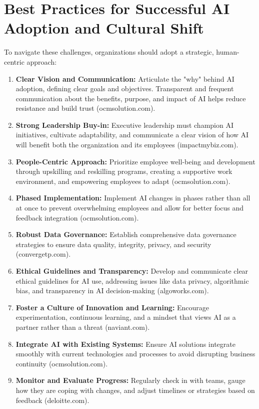 \section{Best Practices for Successful AI Adoption and Cultural Shift}
To navigate these challenges, organizations should adopt a strategic, human-centric approach:
\begin{enumerate}
    \item \textbf{Clear Vision and Communication:} Articulate the "why" behind AI adoption, defining clear goals and objectives. Transparent and frequent communication about the benefits, purpose, and impact of AI helps reduce resistance and build trust (ocmsolution.com).
    \item \textbf{Strong Leadership Buy-in:} Executive leadership must champion AI initiatives, cultivate adaptability, and communicate a clear vision of how AI will benefit both the organization and its employees (impactmybiz.com).
    \item \textbf{People-Centric Approach:} Prioritize employee well-being and development through upskilling and reskilling programs, creating a supportive work environment, and empowering employees to adapt (ocmsolution.com).
    \item \textbf{Phased Implementation:} Implement AI changes in phases rather than all at once to prevent overwhelming employees and allow for better focus and feedback integration (ocmsolution.com).
    \item \textbf{Robust Data Governance:} Establish comprehensive data governance strategies to ensure data quality, integrity, privacy, and security (convergetp.com).
    \item \textbf{Ethical Guidelines and Transparency:} Develop and communicate clear ethical guidelines for AI use, addressing issues like data privacy, algorithmic bias, and transparency in AI decision-making (algoworks.com).
    \item \textbf{Foster a Culture of Innovation and Learning:} Encourage experimentation, continuous learning, and a mindset that views AI as a partner rather than a threat (naviant.com).
    \item \textbf{Integrate AI with Existing Systems:} Ensure AI solutions integrate smoothly with current technologies and processes to avoid disrupting business continuity (ocmsolution.com).
    \item \textbf{Monitor and Evaluate Progress:} Regularly check in with teams, gauge how they are coping with changes, and adjust timelines or strategies based on feedback (deloitte.com).
\end{enumerate}

